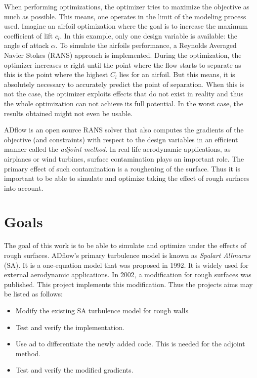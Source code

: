 When performing optimizations, the optimizer tries to maximize the objective as
much as possible. This means, one operates in the limit of the modeling process
used. Imagine an airfoil optimization where the goal is to increase the maximum
coefficient of lift $c_{l}$. In this example, only one design variable is
available: the angle of attack $\alpha$. To simulate the airfoils performance, a
Reynolds Averaged Navier Stokes (RANS) approach is implemented. During the
optimization, the optimizer increases $\alpha$ right until the point where the
flow starts to separate as this is the point where the highest $C_{l}$ lies for
an airfoil. But this means, it is absolutely necessary to accurately predict the
point of separation. When this is not the case, the optimizer exploits effects
that do not exist in reality and thus the whole optimization can not achieve its
full potential. In the worst case, the results obtained might not even be
usable.

ADflow is an open source RANS solver that also computes the gradients of the
objective (and constraints) with respect to the design variables in an efficient
manner called the \textit{adjoint method}. In real life aerodynamic applications,
as airplanes or wind turbines, surface contamination plays an important role.
The primary effect of such contamination is a roughening of the surface. Thus it
is important to be able to simulate and optimize taking the effect of rough
surfaces into account.

\section{Goals}
The goal of this work is to be able to simulate and optimize under the effects
of rough surfaces. ADflow's primary turbulence model is known as \textit{Spalart
  Allmaras}
(SA). It is a one-equation model that was proposed in 1992. It is
widely used for external aerodynamic applications. In 2002, a modification for
rough surfaces was published. This project implements this modification. Thus
the projects aims may be listed as follows:

\begin{itemize}
  \item Modify the existing SA turbulence model for rough walls
  \item Test and verify the implementation.
  \item Use \gls{ad} to differentiate the newly added code. This is needed for
the adjoint method.
  \item Test and verify the modified gradients.
\end{itemize}


